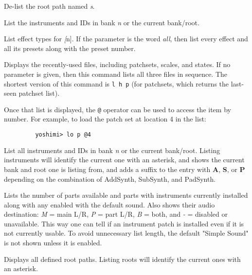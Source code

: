       De-list the root path named \textsl{s}.

      List the instruments and IDs in bank \textsl{n} or the
      current bank/root.

      List effect types for \textsl[n].
      If the parameter is the word \textsl{all},
      then list every effect and all its
      presets along with the preset number.

      Displays the recently-used files, including patchsets, scales, and
      states.  If no parameter is given, then this command lists all three
      files in sequence.  The shortest version of this command is
      \texttt{l h p} (for patchsets, which returns the last-seen patchset list).

      Once that list is displayed,
      the \texttt{@} operator can be used to access
      the item by number.  For example, to load the patch set at location 4 in
      the list:

      \begin{verbatim}
         yoshimi> lo p @4
      \end{verbatim}

      List all instruments and IDs in bank \textsl{n}
      or the current bank/root.
      Listing instruments will identify the current one with an asterisk, and
      shows the current bank and root one is listing from, and adds a suffix to
      the entry with \textbf{A}, \textbf{S}, or \textbf{P}
      depending on the combination of AddSynth, SubSynth, and PadSynth.

      Lists the number of parts available and parts with instruments
      currently installed along with any enabled with the default sound.
      Also shows their audio destination:
      \textsl{M} = main L/R, \textsl{P} = part L/R, \textsl{B} = both, and
      \textsl{-} = disabled or unavailable.
      This way one can tell if an instrument patch is installed even if it is
      not currently usable.
      To avoid unnecessary list length, the default "Simple Sound" is not shown
      unless it is enabled.

      Displays all defined root paths.
      Listing roots will identify the current ones with an asterisk.

